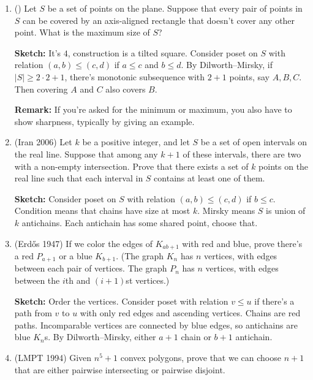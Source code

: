 \documentclass[11pt,paper=letter]{scrartcl}
\begin{document}
\begin{enumerate}

\item (\href{https://mathoverflow.net/questions/421100/is-there-a-configuration-of-5-points-on-the-plane-where-any-two-can-be-covered-b/421101#421101}{\!}) Let $S$ be a set of points on the plane. Suppose that every pair of points in $S$ can be covered by an axis-aligned rectangle that doesn't cover any other point. What is the maximum size of $S$?

\textbf{Sketch:} It's $4$, construction is a tilted square. Consider poset on $S$ with relation $(a, b) \le (c, d)$ if $a \le c$ and $b \le d$. By Dilworth--Mirsky, if $|S| \ge 2 \cdot 2 + 1$, there's monotonic subsequence with $2 + 1$ points, say $A, B, C$. Then covering $A$ and $C$ also covers $B$.

\textbf{Remark:} If you're asked for the minimum or maximum, you also have to show sharpness, typically by giving an example.

\item (Iran 2006) Let $k$ be a positive integer, and let $S$ be a set of open intervals on the real line. Suppose that among any $k + 1$ of these intervals, there are two with a non-empty intersection. Prove that there exists a set of $k$ points on the real line such that each interval in $S$ contains at least one of them.

\textbf{Sketch:} Consider poset on $S$ with relation $(a, b) \le (c, d)$ if $b \le c$. Condition means that chains have size at most $k$. Mirsky means $S$ is union of $k$ antichains. Each antichain has some shared point, choose that.

\item (Erd\H{o}s 1947) If we color the edges of $K_{ab + 1}$ with red and blue, prove there's a red $P_{a + 1}$ or a blue $K_{b + 1}$. (The graph $K_n$ has $n$ vertices, with edges between each pair of vertices. The graph $P_n$ has $n$ vertices, with edges between the $i$th and $(i+1)$st vertices.)

\textbf{Sketch:} Order the vertices. Consider poset with relation $v \le u$ if there's a path from $v$ to $u$ with only red edges and ascending vertices. Chains are red paths. Incomparable vertices are connected by blue edges, so antichains are blue $K_n$s. By Dilworth--Mirsky, either $a + 1$ chain or $b + 1$ antichain.

\item (LMPT 1994) Given $n^5 + 1$ convex polygons, prove that we can choose $n + 1$ that are either pairwise intersecting or pairwise disjoint.


\end{enumerate}
\end{document}
